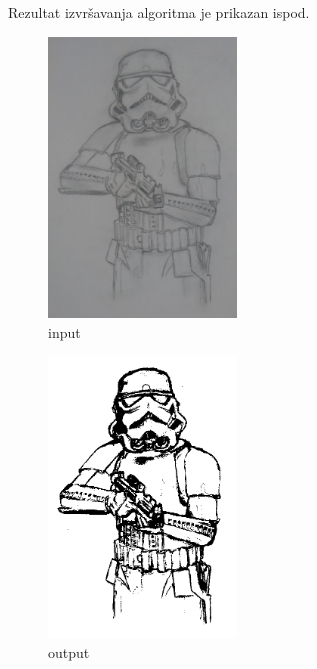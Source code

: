 \documentclass[12pt,a4paper]{article}
\theoremstyle{definition}
\theoremstyle{remark}
\theoremstyle{plain}
\begin{document}
Rezultat izvr\v savanja algoritma je prikazan ispod.
\begin{multicols}{2}
\begin{figure}[H]
\centering
\includegraphics[width=5cm]{images/storm_trooper.jpg}
  \caption{input}\label{storm_trooper_input}
\end{figure}
\columnbreak
\begin{figure}[H]
\centering
\includegraphics[width=5cm]{images/storm_trooper_binarized_fcm.png}
  \caption{output}
\end{figure}
\end{multicols}
\end{document}
